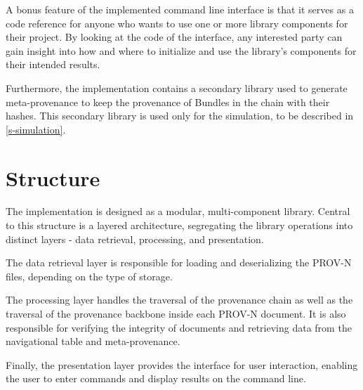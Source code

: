 \documentclass[
  digital,     %
  oneside,     %
  nosansbold,  %
  nocolorbold, %
  lof,         %
  lot,         %
]{fithesis4}
\begin{document}
A bonus feature of the implemented command line interface is that it serves as a code reference for anyone who wants to use one or more library components for their project. By looking at the code of the interface, any interested party can gain insight into how and where to initialize and use the library's components for their intended results.

Furthermore, the implementation contains a secondary library used to generate meta-provenance to keep the provenance of Bundles in the chain with their hashes. This secondary library is used only for the simulation, to be described in \ref{s-simulation}.

\section{Structure}
\shorthandoff{-}
The implementation is designed as a modular, multi-component library. Central to this structure is a layered architecture, segregating the library operations into distinct layers - data retrieval, processing, and presentation. 

The data retrieval layer is responsible for loading and deserializing the PROV-N files, depending on the type of storage. 

The processing layer handles the traversal of the provenance chain as well as the traversal of the provenance backbone inside each PROV-N document. It is also responsible for verifying the integrity of documents and retrieving data from the navigational table and meta-provenance.

Finally, the presentation layer provides the interface for user interaction, enabling the user to enter commands and display results on the command line.
\shorthandon{-}
\end{document}
